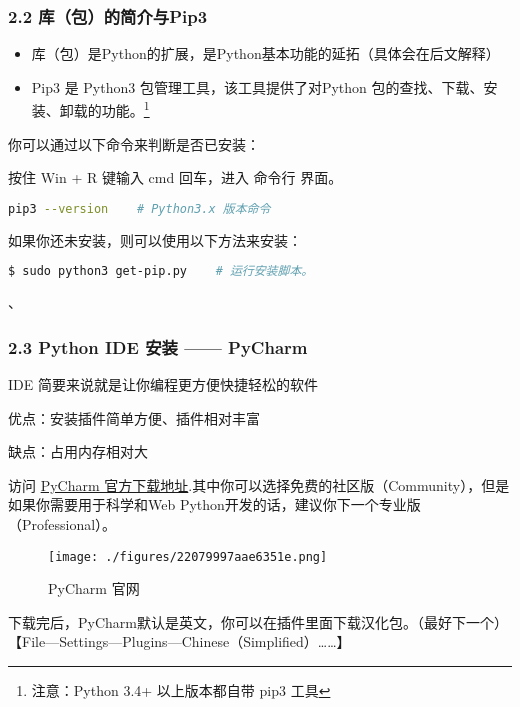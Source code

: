 \subsubsection{2.2 库（包）的简介与Pip3}

\begin{itemize}
\item 库（包）是Python的扩展，是Python基本功能的延拓（具体会在后文解释）
\item Pip3 是 Python3 包管理工具，该工具提供了对Python 包的查找、下载、安装、卸载的功能。\footnote{注意：Python 3.4+ 以上版本都自带 pip3 工具}
\end{itemize}

你可以通过以下命令来判断是否已安装：

按住 Win + R 键输入 cmd 回车，进入 命令行 界面。


\begin{lstlisting}[language=bash]
pip3 --version    # Python3.x 版本命令
\end{lstlisting}

如果你还未安装，则可以使用以下方法来安装：

\begin{lstlisting}[language=bash]
$ sudo python3 get-pip.py    # 运行安装脚本。
\end{lstlisting}、

\subsubsection{2.3 Python IDE 安装 —— PyCharm}

IDE 简要来说就是让你编程更方便快捷轻松的软件

优点：安装插件简单方便、插件相对丰富

缺点：占用内存相对大

访问 \href{http://www.jetbrains.com/pycharm/download/}{PyCharm 官方下载地址}.其中你可以选择免费的社区版（Community），但是如果你需要用于科学和Web Python开发的话，建议你下一个专业版（Professional）。


\begin{figure}[ht]
\centering
\texttt{[image: ./figures/22079997aae6351e.png]}
\caption{PyCharm 官网} \label{fig_Pyc1_1}
\end{figure}

下载完后，PyCharm默认是英文，你可以在插件里面下载汉化包。（最好下一个）【File—Settings—Plugins—Chinese（Simplified）……】

